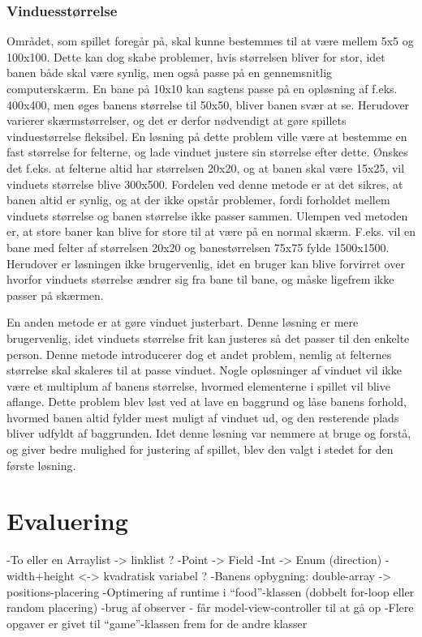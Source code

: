 \documentclass{report}
\begin{document}
\subsubsection{Vinduesstørrelse}
Området, som spillet foregår på, skal kunne bestemmes til at være mellem 5x5 og 100x100. Dette kan dog skabe problemer, hvis størrelsen bliver for stor, idet banen både skal være synlig, men også passe på en gennemsnitlig computerskærm. En bane på 10x10 kan sagtens passe på en opløsning af f.eks. 400x400, men øges banens størrelse til 50x50, bliver banen svær at se. Herudover varierer skærmstørrelser, og det er derfor nødvendigt at gøre spillets vinduestørrelse fleksibel. En løsning på dette problem ville være at bestemme en fast størrelse for felterne, og lade vinduet justere sin størrelse efter dette. Ønskes det f.eks. at felterne altid har størrelsen 20x20, og at banen skal være 15x25, vil vinduets størrelse blive 300x500. Fordelen ved denne metode er at det sikres, at banen altid er synlig, og at der ikke opstår problemer, fordi forholdet mellem vinduets størrelse og banen størrelse ikke passer sammen. Ulempen ved metoden er, at store baner kan blive for store til at være på en normal skærm. F.eks. vil en bane med felter af størrelsen 20x20 og banestørrelsen 75x75 fylde 1500x1500. Herudover er løsningen ikke brugervenlig, idet en bruger kan blive forvirret over hvorfor vinduets størrelse ændrer sig fra bane til bane, og måske ligefrem ikke passer på skærmen.

En anden metode er at gøre vinduet justerbart. Denne løsning er mere brugervenlig, idet vinduets størrelse frit kan justeres så det passer til den enkelte person. Denne metode introducerer dog et andet problem, nemlig at felternes størrelse skal skaleres til at passe vinduet. Nogle opløsninger af vinduet vil ikke være et multiplum af banens størrelse, hvormed elementerne i spillet vil blive aflange. Dette problem blev løst ved at lave en baggrund og låse banens forhold, hvormed banen altid fylder mest muligt af vinduet ud, og den resterende plads bliver udfyldt af baggrunden. Idet denne løsning var nemmere at bruge og forstå, og giver bedre mulighed for justering af spillet, blev den valgt i stedet for den første løsning.

\section{Evaluering}
-To eller en Arraylist -> linklist ?
-Point -> Field
-Int -> Enum (direction)
-width+height <-> kvadratisk variabel ?
-Banens opbygning: double-array -> positions-placering
-Optimering af runtime i “food”-klassen (dobbelt for-loop eller random placering)
-brug af observer - får model-view-controller til at gå op
-Flere opgaver er givet til “game”-klassen frem for de andre klasser
\end{document}
